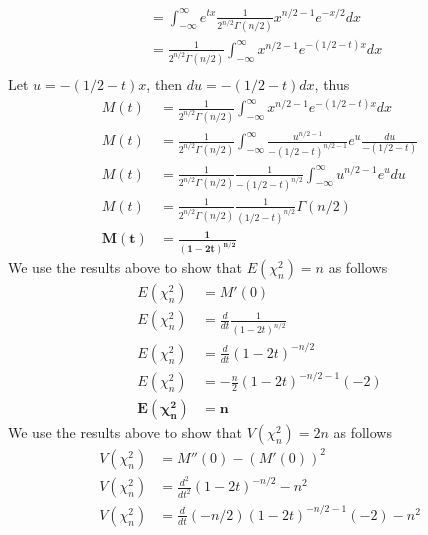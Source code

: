 \documentclass{uofa-eng-assignment}
\begin{document}
\begin{enumerate}
\begin{align*}
                 & = \int_{-\infty}^{\infty} e^{tx} \frac{1}{2^{n/2} \Gamma(n/2)} x^{n/2 - 1} e^{-x/2} dx \\
                 & = \frac{1}{2^{n/2} \Gamma(n/2)} \int_{-\infty}^{\infty} x^{n/2 - 1} e^{-(1/2 - t)x} dx \\
        \end{align*}
        Let $u = -(1/2 - t)x$,
        then $du = -(1/2 - t)dx$, thus
        \begin{align*}
            M(t)              & = \frac{1}{2^{n/2} \Gamma(n/2)} \int_{-\infty}^{\infty} x^{n/2 - 1} e^{-(1/2 - t)x} dx                                      \\
            M(t)              & = \frac{1}{2^{n/2} \Gamma(n/2)} \int_{-\infty}^{\infty} \frac{u^{n/2 - 1}}{-(1/2 - t)^{n/2 - 1}} e^{u}\frac{du}{-(1/2 - t)} \\
            M(t)              & = \frac{1}{2^{n/2} \Gamma(n/2)} \frac{1}{-(1/2 - t)^{n/2}} \int_{-\infty}^{\infty} u^{n/2 - 1} e^{u} du                     \\
            M(t)              & = \frac{1}{2^{n/2} \Gamma(n/2)} \frac{1}{(1/2 - t)^{n/2}} \Gamma(n/2)                                                       \\
            \boldsymbol{M(t)} & \boldsymbol{= \frac{1}{(1 - 2t)^{n/2}}}
        \end{align*}
        We use the results above to show that $E(\chi^2_n) = n$  as follows
        \begin{align*}
            E(\chi^2_n)              & = M'(0)                                 \\
            E(\chi^2_n)              & = \frac{d}{dt} \frac{1}{(1 - 2t)^{n/2}} \\
            E(\chi^2_n)              & = \frac{d}{dt} (1 - 2t)^{-n/2}          \\
            E(\chi^2_n)              & = -\frac{n}{2} (1 - 2t)^{-n/2 - 1} (-2) \\
            \boldsymbol{E(\chi^2_n)} & \boldsymbol{= n}
        \end{align*}
        We use the results above to show that $V(\chi^2_n) = 2n$  as follows
        \begin{align*}
            V(\chi^2_n)              & = M''(0) - (M'(0))^2                                 \\
            V(\chi^2_n)              & = \frac{d^2}{dt^2} (1 - 2t)^{-n/2} - n^2             \\
            V(\chi^2_n)              & = \frac{d}{dt} (-n/2) (1 - 2t)^{-n/2 - 1} (-2) - n^2 \\

\end{align*}
\end{enumerate}
\end{document}
